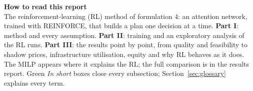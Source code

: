 
\usepackage{adjustbox}





\begin{keybox}
{\color{headblue}\textbf{How to read this report}}\\
The reinforcement-learning (RL) method of formulation 4: an attention network, trained with REINFORCE, that builds a plan one decision at a time. \textbf{Part I}: method and every assumption. \textbf{Part II}: training and an exploratory analysis of the \NInst{} RL runs. \textbf{Part III}: the results point by point, from quality and feasibility to shadow prices, infrastructure utilisation, equity and why RL behaves as it does. The MILP appears where it explains the RL; the full comparison is in the results report. Green \emph{In short} boxes close every subsection; Section~\ref{sec:glossary} explains every term.
\end{keybox}


